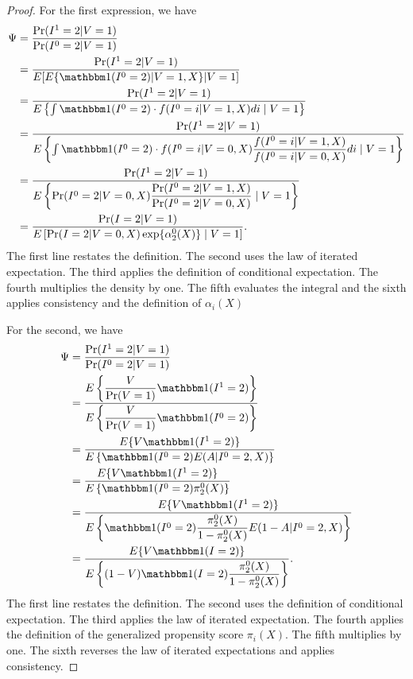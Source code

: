 \begin{appendix}
    \begin{proof}
    For the first expression, we have 
    \begin{align*}
        \Psi &= \dfrac{\Pr(I^1=2|V=1)}{\Pr(I^0=2|V=1)} \\
        &= \dfrac{\Pr(I^1=2|V=1)}{E[E\{\mathbbm 1 (I^0 = 2) | V = 1, X\} | V = 1]} \\
        &= \dfrac{\Pr(I^1=2|V=1)}{E\left\{\int \mathbbm 1 (I^0 = 2) \cdot f(I^0 = i | V = 1, X) di \mid  V = 1\right\}} \\
        &= \dfrac{\Pr(I^1=2|V=1)}{E\left\{\int \mathbbm 1 (I^0 = 2) \cdot f(I^0 = i | V = 0, X) \dfrac{f(I^0 = i | V = 1, X)}{f(I^0 = i | V = 0, X)}di \mid  V = 1\right\}} \\
        &= \dfrac{\Pr(I^1=2|V=1)}{E\left\{ \Pr(I^0 = 2 | V = 0, X) \dfrac{\Pr(I^0 = 2 | V = 1, X)}{\Pr(I^0 = 2 | V = 0, X)} \mid  V = 1\right\}} \\
        &= \dfrac{\Pr(I=2|V=1)}{E\left[ \Pr(I = 2 | V = 0, X) \exp\{\alpha^0_2(X)\} \mid  V = 1\right]}.
    \end{align*}
    The first line restates the definition. The second uses the law of iterated expectation. The third applies the definition of conditional expectation. The fourth multiplies the density by one. The fifth evaluates the integral and the sixth applies consistency and the definition of $\alpha_i(X)$
    
    For the second, we have 
    \begin{align*}
        \Psi &= \dfrac{\Pr(I^1=2|V=1)}{\Pr(I^0=2|V=1)} \\
        &= \dfrac{E\left\{\dfrac{V}{\Pr(V = 1)} \mathbbm 1 (I^1 = 2)\right\}}{E\left\{\dfrac{V}{\Pr(V=1)}\mathbbm 1 (I^0 = 2)\right\}} \\
        &= \dfrac{E\{V \mathbbm 1 (I^1 = 2)\}}{E\left\{\mathbbm 1 (I^0 = 2) E(A | I^0 = 2, X)\right\}} \\
        &= \dfrac{E\{V \mathbbm 1 (I^1 = 2)\}}{E\left\{\mathbbm 1 (I^0 = 2) \pi^0_2(X)\right\}} \\
        &= \dfrac{E\{V \mathbbm 1 (I^1 = 2)\}}{E\left\{\mathbbm 1 (I^0 = 2) \dfrac{\pi^0_2(X)}{1-\pi^0_2(X)}E(1-A|I^0 = 2, X)\right\}} \\
        &= \dfrac{E\{V \mathbbm 1 (I = 2)\}}{E\left\{(1 - V)\mathbbm 1 (I = 2) \dfrac{\pi^0_2(X)}{1-\pi^0_2(X)}\right\}}.
    \end{align*}
    The first line restates the definition. The second uses the definition of conditional expectation. The third applies the law of iterated expectation. The fourth applies the definition of the generalized propensity score $\pi_i(X)$. The fifth multiplies by one. The sixth reverses the law of iterated expectations and applies consistency. 
    \end{proof}
    \newpage
    

\end{appendix}
